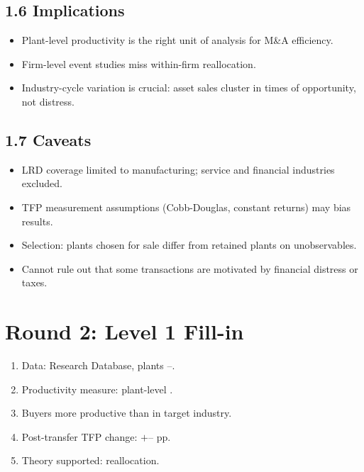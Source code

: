 \documentclass[11pt]{article}
\newcommand{\blank}[1]{\underline{\hspace{#1}}}
\begin{document}
\subsection*{1.6 Implications}
\begin{itemize}
\item Plant-level productivity is the right unit of analysis for M\&A efficiency.
\item Firm-level event studies miss within-firm reallocation.
\item Industry-cycle variation is crucial: asset sales cluster in times of opportunity, not distress.
\end{itemize}

\subsection*{1.7 Caveats}
\begin{alertbox}
\begin{itemize}
\item LRD coverage limited to manufacturing; service and financial industries excluded.
\item TFP measurement assumptions (Cobb-Douglas, constant returns) may bias results.
\item Selection: plants chosen for sale differ from retained plants on unobservables.
\item Cannot rule out that some transactions are motivated by financial distress or taxes.
\end{itemize}
\end{alertbox}

\section*{Round 2: Level 1 Fill-in}
\begin{enumerate}
\item Data: \blank{2cm} Research Database, plants \blank{1cm}--\blank{1cm}.
\item Productivity measure: plant-level \blank{1cm}.
\item Buyers more productive than \blank{2cm} in target industry.
\item Post-transfer TFP change: $+$\blank{1cm}--\blank{1cm} pp.
\item Theory supported: \blank{2cm} reallocation.
\end{enumerate}
\end{document}
